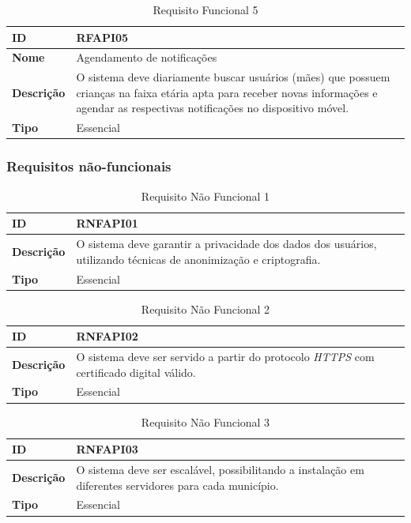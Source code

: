 \begin{table}[H]
\centering
\begin{tabular}{|l|p{12cm}|}
\hline
\textbf{ID} & RFAPI05 \\
\hline
\textbf{Nome} & Agendamento de notificações \\
\hline
\textbf{Descrição} & O sistema deve diariamente buscar usuários (mães) que possuem crianças na faixa etária apta para receber novas informações e agendar as respectivas notificações no dispositivo móvel. \\
\hline
\textbf{Tipo} & Essencial \\
\hline
\end{tabular}
\caption[RFAPI05 -- Agendamento de notificações]{Requisito Funcional 5}
\label{tab:rfapi05}
\end{table}


\subsubsection{Requisitos não-funcionais}

\begin{table}[H]
\centering
\begin{tabular}{|l|p{12cm}|}
\hline
\textbf{ID} & RNFAPI01 \\
\hline
\textbf{Descrição} & O sistema deve garantir a privacidade dos dados dos usuários, utilizando técnicas de anonimização e criptografia. \\
\hline
\textbf{Tipo} & Essencial \\
\hline
\end{tabular}
\caption[RNFAPI01 -- Privacidade dos dados dos usuários]{Requisito Não Funcional 1}
\label{tab:rnfapi01}
\end{table}

\begin{table}[H]
\centering
\begin{tabular}{|l|p{12cm}|}
\hline
\textbf{ID} & RNFAPI02 \\
\hline
\textbf{Descrição} & O sistema deve ser servido a partir do protocolo \emph{HTTPS} com certificado digital válido. \\
\hline
\textbf{Tipo} & Essencial \\
\hline
\end{tabular}
\caption[RNFAPI02 -- Uso de HTTPS e certificado digital]{Requisito Não Funcional 2}
\label{tab:rnfapi02}
\end{table}

\begin{table}[H]
\centering
\begin{tabular}{|l|p{12cm}|}
\hline
\textbf{ID} & RNFAPI03 \\
\hline
\textbf{Descrição} & O sistema deve ser escalável, possibilitando a instalação em diferentes servidores para cada município. \\
\hline
\textbf{Tipo} & Essencial \\
\hline
\end{tabular}
\caption[RNFAPI03 -- Escalabilidade para diferentes servidores]{Requisito Não Funcional 3}
\label{tab:rnfapi03}
\end{table}

